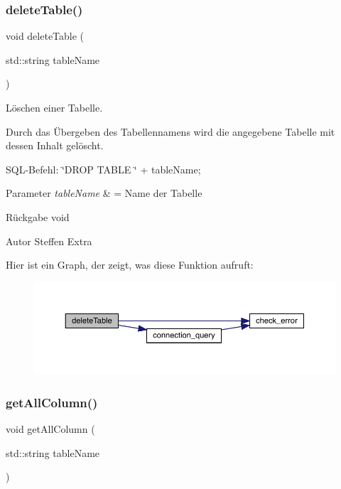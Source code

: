 \subsubsection{delete\+Table()}
{\footnotesize\ttfamily void delete\+Table (\begin{DoxyParamCaption}\item[{std\+::string}]{table\+Name }\end{DoxyParamCaption})}



Löschen einer Tabelle. 

Durch das Übergeben des Tabellennamens wird die angegebene Tabelle mit dessen Inhalt gelöscht.~\newline


S\+Q\+L-\/\+Befehl\+: \char`\"{}\+D\+R\+O\+P T\+A\+B\+L\+E \char`\"{} + table\+Name;


\begin{DoxyParams}{Parameter}
{\em table\+Name} & = Name der Tabelle\\
\hline
\end{DoxyParams}
\begin{DoxyReturn}{Rückgabe}
void
\end{DoxyReturn}
\begin{DoxyAuthor}{Autor}
Steffen Extra 
\end{DoxyAuthor}
Hier ist ein Graph, der zeigt, was diese Funktion aufruft\+:\nopagebreak
\begin{figure}[H]
\begin{center}
\leavevmode
\includegraphics[width=350pt]{tables_8hpp_a9754762b2c19711bf3dcbfceca61d97d_cgraph}
\end{center}
\end{figure}
\mbox{\label{tables_8hpp_aceb780082d3f7392e485cac394d6c606}} 
\subsubsection{get\+All\+Column()}
{\footnotesize\ttfamily void get\+All\+Column (\begin{DoxyParamCaption}\item[{std\+::string}]{table\+Name }\end{DoxyParamCaption})}



